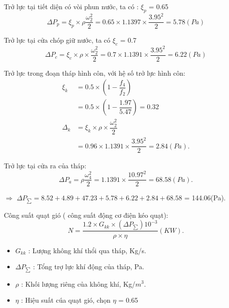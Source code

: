 Trở lực tại tiết diện có vòi phun nước, ta có : $\xi_{p}$ = 0.65
\begin{equation*}
	\Delta P_{p} = \xi_{p} \times \rho 
	\dfrac{\omega_{2}^2}{2} = 0.65 \times 1.1397 \times \dfrac{3.95^2}{2} = 5.78(Pa)
\end{equation*}

Trở lực tại cửa chóp giữ nước, ta có $\xi_{c}$ = 0.7
\begin{equation*}
	\Delta P_{c} = \xi_{c} \times \rho \times  
	\dfrac{\omega_{2}^2}{2} = 0.7 \times 1.1391 \times \dfrac{3.95^2}{2} = 6.22(Pa)
\end{equation*}

Trở lực trong đoạn tháp hình côn, với hệ số trở lực hình côn:
\begin{equation*}
	\begin{split}
		\xi_{k}& = 0.5 \times (1 - \dfrac{f_{4}}{f_{2}})\\
			& = 0.5 \times (1 - \dfrac{1.97}{5.47}) = 0.32\\
		\Delta_{k}& = \xi_{k} \times \rho \times \dfrac{\omega_{2}^2}{2}	\\
				  & = 0.96 \times 1.1391 \times \dfrac{3.95^2}{2} = 2.84(Pa).		 		
	\end{split}
\end{equation*}

Trở lực tại cửa ra của tháp:
\begin{equation*}
	\Delta P_{a} = \rho \dfrac{\omega_{4}^2}{2} = 1.1391 \times \dfrac{10.97^2}{2} = 68.58(Pa).
\end{equation*}

$\Rightarrow$ $\Delta P_{\sum} = 8.52 + 4.89 + 47.23 + 5.78 + 6.22 + 2.84 + 68.58$ = 144.06(Pa).

Công suất quạt gió ( công suất động cơ điện kéo quạt):
\begin{equation*}
	N = \dfrac{1.2 \times G_{kk} \times (\Delta P_{\sum}) 10^{-3}}{\rho \times \eta } (KW).
\end{equation*}

\begin{itemize}
	\item $G_{kk}$ : Lượng không khí thổi qua tháp, Kg/s.
	\item $\Delta P_{\sum}$ : Tổng trợ lực khí động của tháp, Pa.
	\item $\rho$ : Khối lượng riêng của không khí, Kg/$m^3$. 
	\item $\eta$ : Hiệu suất cúa quạt gió, chọn $\eta$ = 0.65
\end{itemize}


